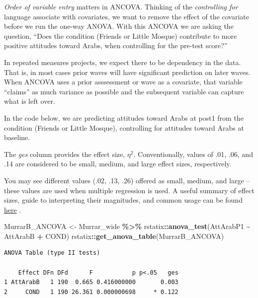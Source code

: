 \documentclass[
  11pt,
]{book}
\newenvironment{Shaded}{\begin{snugshade}}{\end{snugshade}}
\newcommand{\FunctionTok}[1]{\textcolor[rgb]{0.27,0.27,0.27}{\textbf{#1}}}
\newcommand{\NormalTok}[1]{#1}
\newcommand{\OtherTok}[1]{\textcolor[rgb]{0.37,0.37,0.37}{#1}}
\newcommand{\SpecialCharTok}[1]{\textcolor[rgb]{0.43,0.43,0.43}{\textbf{#1}}}
\begin{document}
\emph{Order of variable entry} matters in ANCOVA. Thinking of the \emph{controlling for} language associate with covariates, we want to remove the effect of the covariate before we run the one-way ANOVA. With this ANCOVA we are asking the question, ``Does the condition (Friends or Little Mosque) contribute to more positive attitudes toward Arabs, when controlling for the pre-test score?''

In repeated measures projects, we expect there to be dependency in the data. That is, in most cases prior waves will have significant prediction on later waves. When ANCOVA uses a prior asssessment or wave as a covariate, that variable ``claims'' as much variance as possible and the subsequent variable can capture what is left over.

In the code below, we are predicting attitudes toward Arabs at post1 from the condition (Friends or Little Mosque), controlling for attitudes toward Arabs at baseline.

The \emph{ges} column provides the effect size, \(\eta^2\). Conventionally, values of .01, .06, and .14 are considered to be small, medium, and large effect sizes, respectively.

You may see different values (.02, .13, .26) offered as small, medium, and large -- these values are used when multiple regression is used. A useful summary of effect sizes, guide to interpreting their magnitudes, and common usage can be found \href{https://imaging.mrc-cbu.cam.ac.uk/statswiki/FAQ/effectSize}{here} \citep{watson_rules_2020}.

\begin{Shaded}
\begin{Highlighting}[]
\NormalTok{MurrarB\_ANCOVA }\OtherTok{\textless{}{-}}\NormalTok{ Murrar\_wide }\SpecialCharTok{\%\textgreater{}\%}
\NormalTok{    rstatix}\SpecialCharTok{::}\FunctionTok{anova\_test}\NormalTok{(AttArabP1 }\SpecialCharTok{\textasciitilde{}}\NormalTok{ AttArabB }\SpecialCharTok{+}\NormalTok{ COND)}
\NormalTok{rstatix}\SpecialCharTok{::}\FunctionTok{get\_anova\_table}\NormalTok{(MurrarB\_ANCOVA)}
\end{Highlighting}
\end{Shaded}

\begin{verbatim}
ANOVA Table (type II tests)

    Effect DFn DFd      F           p p<.05   ges
1 AttArabB   1 190  0.665 0.416000000       0.003
2     COND   1 190 26.361 0.000000698     * 0.122
\end{verbatim}
\end{document}
